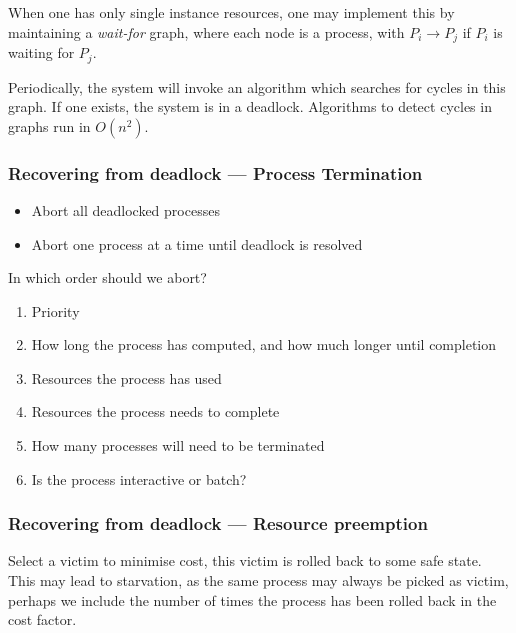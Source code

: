 When one has only single instance resources, one may implement this by maintaining a \textit{wait-for} graph, where each node is a process, with $P_i\to P_j$ if $P_i$ is waiting
for $P_j$.

Periodically, the system will invoke an algorithm which searches for cycles in this graph. If one exists, the system is in a deadlock. Algorithms to detect cycles in graphs run in $O(n^2)$.


\subsubsection{Recovering from deadlock --- Process Termination}

\begin{itemize}
    \item Abort all deadlocked processes
    \item Abort one process at a time until deadlock is resolved
\end{itemize}

In which order should we abort?

\begin{enumerate}
    \item Priority
    \item How long the process has computed, and how much longer until completion
    \item Resources the process has used
    \item Resources the process needs to complete
    \item How many processes will need to be terminated
    \item Is the process interactive or batch?
\end{enumerate}


\subsubsection{Recovering from deadlock --- Resource preemption}

Select a victim to minimise cost, this victim is rolled back to some safe state. This may lead to starvation, as the same process may always be picked as victim,
perhaps we include the number of times the process has been rolled back in the cost factor.